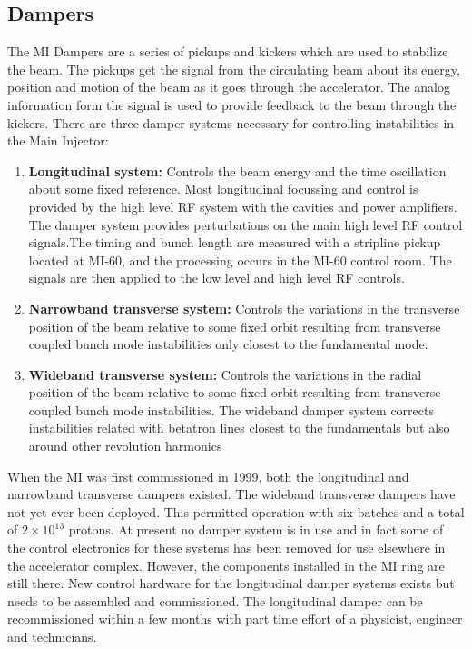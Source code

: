 \documentclass{article}
\begin{document}
\subsection {Dampers}
The MI Dampers are a series of pickups and kickers which are used to stabilize
the beam. The pickups get the signal from 
the circulating beam about its energy, position and motion 
of the beam as it goes
through the accelerator. The analog information form the signal is used to
provide feedback to the beam through the kickers.
There are three damper systems necessary for controlling instabilities in the 
Main Injector:
\begin {enumerate}
\item {\bf Longitudinal system:}
Controls the beam energy and the time oscillation 
about some fixed reference. Most longitudinal focussing and control is 
provided by the high level RF system with the cavities and power amplifiers. 
The damper system provides perturbations on the main high level RF control 
signals.The timing and bunch length are measured 
with a stripline pickup located at MI-60, and the processing occurs in the
MI-60 control room. The signals are then applied to the low level and high 
level RF controls.
\item {\bf Narrowband transverse system:}
Controls the variations in the transverse position 
of the beam relative to some fixed orbit resulting from 
transverse coupled bunch mode instabilities only 
closest to the fundamental mode.
\item {\bf Wideband transverse system:}
Controls the variations in the radial position 
of the beam relative to some fixed orbit resulting from 
transverse coupled bunch mode instabilities. The wideband damper system 
corrects instabilities related with betatron lines closest to the
fundamentals but also around other revolution harmonics
\end {enumerate}


When the MI was first commissioned in 1999, both the longitudinal and 
narrowband transverse dampers existed. The wideband transverse dampers have
not yet ever been deployed.
This permitted operation with six batches 
and a total of $2\times10^{13}$ protons. At present no damper system 
is in use and in fact some of the control electronics for these systems 
has been removed for use elsewhere in the accelerator complex. However,
the components installed in the MI ring are still there. New control
hardware for the longitudinal damper systems exists but needs to be 
assembled and commissioned. The longitudinal damper can be 
recommissioned within a few months with part time effort of a physicist,
engineer and technicians.
\end{document}
